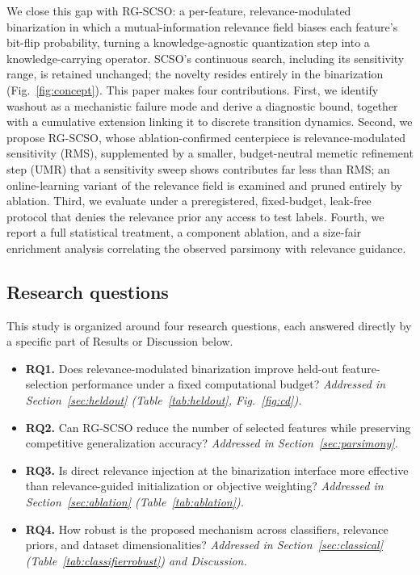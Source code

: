 \documentclass[iicol,sn-basic,pdflatex]{sn-jnl}
\begin{document}
We close this gap with RG-SCSO: a per-feature, relevance-modulated
binarization in which a mutual-information relevance field biases each
feature's bit-flip probability, turning a knowledge-agnostic quantization
step into a knowledge-carrying operator. SCSO's continuous search, including
its sensitivity range, is retained unchanged; the novelty resides entirely in
the binarization (Fig.~\ref{fig:concept}). This paper makes four
contributions. First, we identify washout as a mechanistic failure mode and
derive a diagnostic bound, together with a cumulative extension linking it to
discrete transition dynamics. Second, we propose RG-SCSO, whose
ablation-confirmed centerpiece is relevance-modulated sensitivity (RMS),
supplemented by a smaller, budget-neutral memetic refinement step (UMR) that a
sensitivity sweep shows contributes far less than RMS; an online-learning
variant of the relevance field is examined and pruned entirely by ablation.
Third, we evaluate under a preregistered, fixed-budget, leak-free protocol
that denies the relevance prior any access to test labels. Fourth, we report a
full statistical treatment, a component ablation, and a size-fair enrichment
analysis correlating the observed parsimony with relevance guidance.

\subsection{Research questions}
This study is organized around four research questions, each answered
directly by a specific part of Results or Discussion below.
\begin{itemize}
\item \textbf{RQ1.} Does relevance-modulated binarization improve held-out
  feature-selection performance under a fixed computational budget?
  \emph{Addressed in Section~\ref{sec:heldout} (Table~\ref{tab:heldout},
  Fig.~\ref{fig:cd}).}
\item \textbf{RQ2.} Can RG-SCSO reduce the number of selected features while
  preserving competitive generalization accuracy?
  \emph{Addressed in Section~\ref{sec:parsimony}.}
\item \textbf{RQ3.} Is direct relevance injection at the binarization
  interface more effective than relevance-guided initialization or
  objective weighting?
  \emph{Addressed in Section~\ref{sec:ablation} (Table~\ref{tab:ablation}).}
\item \textbf{RQ4.} How robust is the proposed mechanism across
  classifiers, relevance priors, and dataset dimensionalities?
  \emph{Addressed in Section~\ref{sec:classical}
  (Table~\ref{tab:classifierrobust}) and Discussion.}
\end{itemize}
\end{document}
